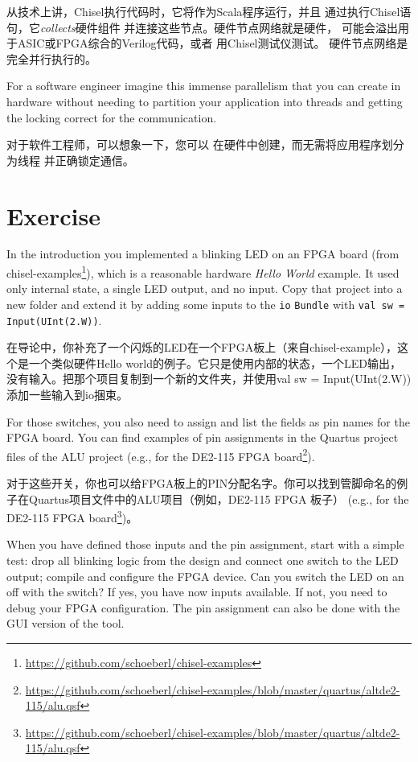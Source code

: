 \documentclass[%
    10pt,
    headinclude, footexclude,
    openright, %
    notitlepage,
    cleardoubleempty,
    headsepline,
    pointlessnumbers,
    bibtotoc, idxtotoc,
    ]{scrbook}
\newcommand{\code}[1]{{\small{\texttt{#1}}}}
\newcommand{\myref}[2]{\href{#1}{#2}}
\renewcommand{\myref}[2]{{#2}{\footnote{\url{#1}}}}
\begin{document}
从技术上讲，Chisel执行代码时，它将作为Scala程序运行，并且
通过执行Chisel语句，它\emph{collects}硬件组件
并连接这些节点。硬件节点网络就是硬件，
可能会溢出用于ASIC或FPGA综合的Verilog代码，或者
用Chisel测试仪测试。
硬件节点网络是完全并行执行的。

For a software engineer imagine this immense parallelism that you can
create in hardware without needing to partition your application into threads
and getting the locking correct for the communication.


对于软件工程师，可以想象一下，您可以
在硬件中创建，而无需将应用程序划分为线程
并正确锁定通信。

\section{Exercise}

In the introduction you implemented a blinking LED on an FPGA board
(from \myref{https://github.com/schoeberl/chisel-examples}{chisel-examples}), which is a reasonable
hardware \emph{Hello World} example. It used only internal state, a single LED output, and no input.
Copy that project into a new folder and extend it by adding some inputs to the \code{io} \code{Bundle}
with \code{val sw = Input(UInt(2.W))}.

在导论中，你补充了一个闪烁的LED在一个FPGA板上（来自chisel-example），这个是一个类似硬件Hello world的例子。它只是使用内部的状态，一个LED输出，没有输入。把那个项目复制到一个新的文件夹，并使用val sw = Input(UInt(2.W))添加一些输入到io捆束。



\noindent For those switches, you also need to assign and list the fields as pin names for the FPGA board.
You can find examples of pin assignments in the Quartus project files of the ALU project
(e.g., for the \myref{https://github.com/schoeberl/chisel-examples/blob/master/quartus/altde2-115/alu.qsf}{DE2-115
FPGA board}).

对于这些开关，你也可以给FPGA板上的PIN分配名字。你可以找到管脚命名的例子在Quartus项目文件中的ALU项目（例如，DE2-115 FPGA 板子）
(e.g., for the \myref{https://github.com/schoeberl/chisel-examples/blob/master/quartus/altde2-115/alu.qsf}{DE2-115
FPGA board})。

When you have defined those inputs and the pin assignment, start with a simple test:
drop all blinking logic from the design and connect one switch to the LED output;
compile and configure the FPGA device. Can you switch the LED on an off with the switch?
If yes, you have now inputs available. If not, you need to debug your FPGA configuration.
The pin assignment can also be done with the GUI version of the tool.
\end{document}
